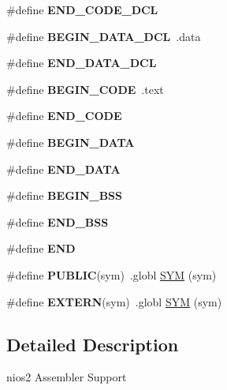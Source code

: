 \begin{DoxyCompactItemize}
\#define {\bfseries E\+N\+D\+\_\+\+C\+O\+D\+E\+\_\+\+D\+CL}
\item 
\mbox{\label{group__RTEMSScoreCPUnios2ASM_ga7f059077f76d2de57e245990dc6fdf25}} 
\#define {\bfseries B\+E\+G\+I\+N\+\_\+\+D\+A\+T\+A\+\_\+\+D\+CL}~.data
\item 
\mbox{\label{group__RTEMSScoreCPUnios2ASM_gaba5951c6a7df52e7c13d07a6823e9758}} 
\#define {\bfseries E\+N\+D\+\_\+\+D\+A\+T\+A\+\_\+\+D\+CL}
\item 
\mbox{\label{group__RTEMSScoreCPUnios2ASM_ga6d6dc213aff5b736968e2aff37eb2c99}} 
\#define {\bfseries B\+E\+G\+I\+N\+\_\+\+C\+O\+DE}~.text
\item 
\mbox{\label{group__RTEMSScoreCPUnios2ASM_gaac423acb743520558daf6a94e1e34534}} 
\#define {\bfseries E\+N\+D\+\_\+\+C\+O\+DE}
\item 
\mbox{\label{group__RTEMSScoreCPUnios2ASM_ga93fba2b033eb50ec004405c59faaa824}} 
\#define {\bfseries B\+E\+G\+I\+N\+\_\+\+D\+A\+TA}
\item 
\mbox{\label{group__RTEMSScoreCPUnios2ASM_gab989978585b78e98ff314e8abb5f9bb0}} 
\#define {\bfseries E\+N\+D\+\_\+\+D\+A\+TA}
\item 
\mbox{\label{group__RTEMSScoreCPUnios2ASM_ga50f110f0489e48ceda4a0473a35d2978}} 
\#define {\bfseries B\+E\+G\+I\+N\+\_\+\+B\+SS}
\item 
\mbox{\label{group__RTEMSScoreCPUnios2ASM_gae8acdd1ba8aa625ce8a829773fd512e2}} 
\#define {\bfseries E\+N\+D\+\_\+\+B\+SS}
\item 
\mbox{\label{group__RTEMSScoreCPUnios2ASM_ga29fd18bed01c4d836c7ebfe73a125c3f}} 
\#define {\bfseries E\+ND}
\item 
\mbox{\label{group__RTEMSScoreCPUnios2ASM_ga5e536c0e80cb78da6a74541281111e40}} 
\#define {\bfseries P\+U\+B\+L\+IC}(sym)~.globl \mbox{\hyperlink{group__RTEMSScoreCPUx86-64ASM_gafe05d428a5f345f51fb591debb815325}{S\+YM}} (sym)
\item 
\mbox{\label{group__RTEMSScoreCPUnios2ASM_ga9808b867f8d1bd54d78548a5cd5dc415}} 
\#define {\bfseries E\+X\+T\+E\+RN}(sym)~.globl \mbox{\hyperlink{group__RTEMSScoreCPUx86-64ASM_gafe05d428a5f345f51fb591debb815325}{S\+YM}} (sym)
\end{DoxyCompactItemize}


\subsection{Detailed Description}
nios2 Assembler Support 

